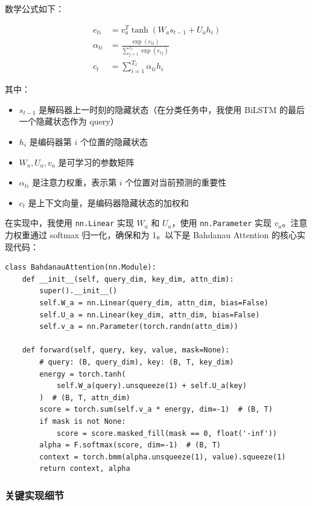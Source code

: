 \documentclass[a4paper]{article}
\begin{document}
数学公式如下：

\begin{align}
e_{ti} &= v_a^T \tanh(W_a s_{t-1} + U_a h_i) \\
\alpha_{ti} &= \frac{\exp(e_{ti})}{\sum_{j=1}^{T_x} \exp(e_{tj})} \\
c_t &= \sum_{i=1}^{T_x} \alpha_{ti} h_i
\end{align}

其中：
\begin{itemize}
    \item $s_{t-1}$ 是解码器上一时刻的隐藏状态（在分类任务中，我使用 BiLSTM 的最后一个隐藏状态作为 query）
    \item $h_i$ 是编码器第 $i$ 个位置的隐藏状态
    \item $W_a, U_a, v_a$ 是可学习的参数矩阵
    \item $\alpha_{ti}$ 是注意力权重，表示第 $i$ 个位置对当前预测的重要性
    \item $c_t$ 是上下文向量，是编码器隐藏状态的加权和
\end{itemize}

在实现中，我使用 \texttt{nn.Linear} 实现 $W_a$ 和 $U_a$，使用 \texttt{nn.Parameter} 实现 $v_a$。注意力权重通过 softmax 归一化，确保和为 1。以下是 Bahdanau Attention 的核心实现代码：

\begin{codebox}
\begin{lstlisting}[style=pyframe]
class BahdanauAttention(nn.Module):
    def __init__(self, query_dim, key_dim, attn_dim):
        super().__init__()
        self.W_a = nn.Linear(query_dim, attn_dim, bias=False)
        self.U_a = nn.Linear(key_dim, attn_dim, bias=False)
        self.v_a = nn.Parameter(torch.randn(attn_dim))

    def forward(self, query, key, value, mask=None):
        # query: (B, query_dim), key: (B, T, key_dim)
        energy = torch.tanh(
            self.W_a(query).unsqueeze(1) + self.U_a(key)
        )  # (B, T, attn_dim)
        score = torch.sum(self.v_a * energy, dim=-1)  # (B, T)
        if mask is not None:
            score = score.masked_fill(mask == 0, float('-inf'))
        alpha = F.softmax(score, dim=-1)  # (B, T)
        context = torch.bmm(alpha.unsqueeze(1), value).squeeze(1)
        return context, alpha
\end{lstlisting}
\end{codebox}

\subsubsection{关键实现细节}
\end{document}
